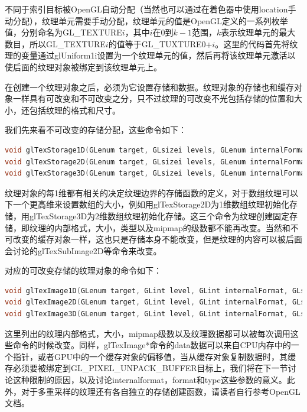 不同于索引目标被OpenGL自动分配（当然也可以通过在着色器中使用location手动分配），纹理单元需要手动分配，纹理单元的值是OpenGL定义的一系列枚举值，分别命名为GL\_TEXTURE$i$，其中$i$在0到$k-1$范围，$k$表示纹理单元的最大数目，所以GL\_TEXTURE$i$的值等于GL\_TUXTURE0+$i$。这里的代码首先将纹理的变量通过glUniform1i设置为一个纹理单元的值，然后再将该纹理单元激活以使后面的纹理对象被绑定到该纹理单元上。

在创建一个纹理对象之后，必须为它设置存储和数据。纹理对象的存储也和缓存对象一样具有可改变和不可改变之分，只不过纹理的可改变不光包括存储的位置和大小，还包括纹理的格式和尺寸。

我们先来看不可改变的存储分配，这些命令如下：

\begin{lstlisting}[language=C++]
void glTexStorage1D(GLenum target, GLsizei levels, GLenum internalFormat, GLsizei width);
void glTexStorage2D(GLenum target, GLsizei levels, GLenum internalFormat, GLsizei width, GLsizei height);
void glTexStorage3D(GLenum target, GLsizei levels, GLenum internalFormat, GLsizei width, GLsizei height, GLsizei depth);
\end{lstlisting}

纹理对象的每1维都有相关的决定纹理边界的存储函数的定义，对于数组纹理可以下一个更高维来设置数组的大小，例如用glTexStorage2D为1维数组纹理初始化存储，用glTexStorage3D为2维数组纹理初始化存储。这三个命令为纹理创建固定存储，即纹理的内部格式，大小，类型以及mipmap的级数都不能再改变。当然和不可改变的缓存对象一样，这也只是存储本身不能改变，但是纹理的内容可以被后面会讨论的glTexSubImage2D等命令来改变。

对应的可改变存储的纹理对象的命令如下：

\begin{lstlisting}[language=C++]
void glTexImage1D(GLenum target, GLint level, GLint internalFormat, GLsizei width, GLint border, GLenum format, GLenum type, const void *data);
void glTexImage2D(GLenum target, GLint level, GLint internalFormat, GLsizei width, GLsizei height, GLint border, GLenum format, GLenum type, const void *data);
void glTexImage3D(GLenum target, GLint level, GLint internalFormat, GLsizei width,GLsizei height, GLsizei depth, GLint border, GLenum format, GLenum type, const void *data);
\end{lstlisting}

这里列出的纹理内部格式，大小，mipmap级数以及纹理数据都可以被每次调用这些命令的时候改变。同样，glTexImage*命令的data数据可以来自CPU内存中的一个指针，或者GPU中的一个缓存对象的偏移值，当从缓存对象复制数据时，其缓存必须要被绑定到GL\_PIXEL\_UNPACK\_BUFFER目标上，我们将在下一节讨论这种限制的原因，以及讨论internalformat，format和type这些参数的意义。此外，对于多重采样的纹理还有各自独立的存储创建函数，请读者自行参考OpenGL文档\cite{b:OpenGL4.5CoreProfile}。





